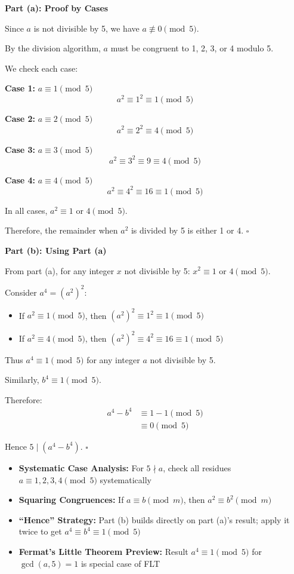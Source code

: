\begin{solution}
\textbf{Part (a): Proof by Cases}

Since $a$ is not divisible by 5, we have $a \not\equiv 0 \pmod{5}$.

By the division algorithm, $a$ must be congruent to 1, 2, 3, or 4 modulo 5.

We check each case:

\textbf{Case 1:} $a \equiv 1 \pmod{5}$
\[ a^2 \equiv 1^2 \equiv 1 \pmod{5} \]

\textbf{Case 2:} $a \equiv 2 \pmod{5}$
\[ a^2 \equiv 2^2 \equiv 4 \pmod{5} \]

\textbf{Case 3:} $a \equiv 3 \pmod{5}$
\[ a^2 \equiv 3^2 \equiv 9 \equiv 4 \pmod{5} \]

\textbf{Case 4:} $a \equiv 4 \pmod{5}$
\[ a^2 \equiv 4^2 \equiv 16 \equiv 1 \pmod{5} \]

In all cases, $a^2 \equiv 1$ or $4 \pmod{5}$.

Therefore, the remainder when $a^2$ is divided by 5 is either 1 or 4. \hfill $\square$

\vspace{1em}

\textbf{Part (b): Using Part (a)}

From part (a), for any integer $x$ not divisible by 5: $x^2 \equiv 1$ or $4 \pmod{5}$.

Consider $a^4 = (a^2)^2$:
\begin{itemize}
    \item If $a^2 \equiv 1 \pmod{5}$, then $(a^2)^2 \equiv 1^2 \equiv 1 \pmod{5}$
    \item If $a^2 \equiv 4 \pmod{5}$, then $(a^2)^2 \equiv 4^2 \equiv 16 \equiv 1 \pmod{5}$
\end{itemize}

Thus $a^4 \equiv 1 \pmod{5}$ for any integer $a$ not divisible by 5.

Similarly, $b^4 \equiv 1 \pmod{5}$.

Therefore:
\begin{align*}
    a^4 - b^4 &\equiv 1 - 1 \pmod{5} \\
    &\equiv 0 \pmod{5}
\end{align*}

Hence $5 \mid (a^4 - b^4)$. \hfill $\square$
\end{solution}

\begin{takeaways}
\begin{itemize}
\item \textbf{Systematic Case Analysis:} For $5 \nmid a$, check all residues $a \equiv 1, 2, 3, 4 \pmod{5}$ systematically
\item \textbf{Squaring Congruences:} If $a \equiv b \pmod{m}$, then $a^2 \equiv b^2 \pmod{m}$
\item \textbf{``Hence'' Strategy:} Part (b) builds directly on part (a)'s result; apply it twice to get $a^4 \equiv b^4 \equiv 1 \pmod{5}$
\item \textbf{Fermat's Little Theorem Preview:} Result $a^4 \equiv 1 \pmod{5}$ for $\gcd(a,5)=1$ is special case of FLT
\end{itemize}
\end{takeaways}
